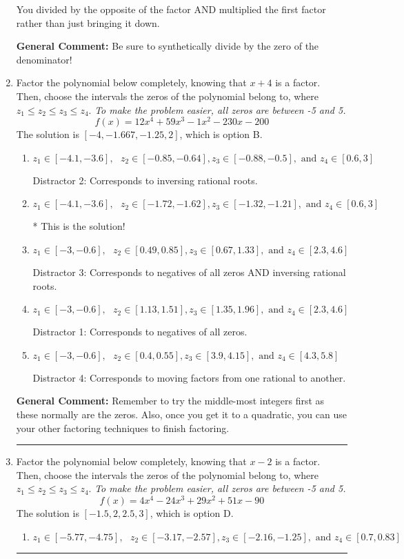 \documentclass{extbook}[14pt]
\newcommand{\litem}[1]{\item #1

\rule{\textwidth}{0.4pt}}
\begin{document}
\begin{enumerate}
{\begin{enumerate}[label=\Alph*.]
 You divided by the opposite of the factor AND multiplied the first factor rather than just bringing it down.
\end{enumerate}

\textbf{General Comment:} Be sure to synthetically divide by the zero of the denominator!
}
\litem{
Factor the polynomial below completely, knowing that $x + 4$ is a factor. Then, choose the intervals the zeros of the polynomial belong to, where $z_1 \leq z_2 \leq z_3 \leq z_4$. \textit{To make the problem easier, all zeros are between -5 and 5.}
\[ f(x) = 12x^{4} +59 x^{3} -1 x^{2} -230 x -200 \]The solution is \( [-4, -1.667, -1.25, 2] \), which is option B.\begin{enumerate}[label=\Alph*.]
\item \( z_1 \in [-4.1, -3.6], \text{   }  z_2 \in [-0.85, -0.64], z_3 \in [-0.88, -0.5], \text{   and   } z_4 \in [0.6, 3] \)

 Distractor 2: Corresponds to inversing rational roots.
\item \( z_1 \in [-4.1, -3.6], \text{   }  z_2 \in [-1.72, -1.62], z_3 \in [-1.32, -1.21], \text{   and   } z_4 \in [0.6, 3] \)

* This is the solution!
\item \( z_1 \in [-3, -0.6], \text{   }  z_2 \in [0.49, 0.85], z_3 \in [0.67, 1.33], \text{   and   } z_4 \in [2.3, 4.6] \)

 Distractor 3: Corresponds to negatives of all zeros AND inversing rational roots.
\item \( z_1 \in [-3, -0.6], \text{   }  z_2 \in [1.13, 1.51], z_3 \in [1.35, 1.96], \text{   and   } z_4 \in [2.3, 4.6] \)

 Distractor 1: Corresponds to negatives of all zeros.
\item \( z_1 \in [-3, -0.6], \text{   }  z_2 \in [0.4, 0.55], z_3 \in [3.9, 4.15], \text{   and   } z_4 \in [4.3, 5.8] \)

 Distractor 4: Corresponds to moving factors from one rational to another.
\end{enumerate}

\textbf{General Comment:} Remember to try the middle-most integers first as these normally are the zeros. Also, once you get it to a quadratic, you can use your other factoring techniques to finish factoring.
}
\litem{
Factor the polynomial below completely, knowing that $x -2$ is a factor. Then, choose the intervals the zeros of the polynomial belong to, where $z_1 \leq z_2 \leq z_3 \leq z_4$. \textit{To make the problem easier, all zeros are between -5 and 5.}
\[ f(x) = 4x^{4} -24 x^{3} +29 x^{2} +51 x -90 \]The solution is \( [-1.5, 2, 2.5, 3] \), which is option D.\begin{enumerate}[label=\Alph*.]
\item \( z_1 \in [-5.77, -4.75], \text{   }  z_2 \in [-3.17, -2.57], z_3 \in [-2.16, -1.25], \text{   and   } z_4 \in [0.7, 0.83] \)


\end{enumerate}}
\end{enumerate}
\end{document}
